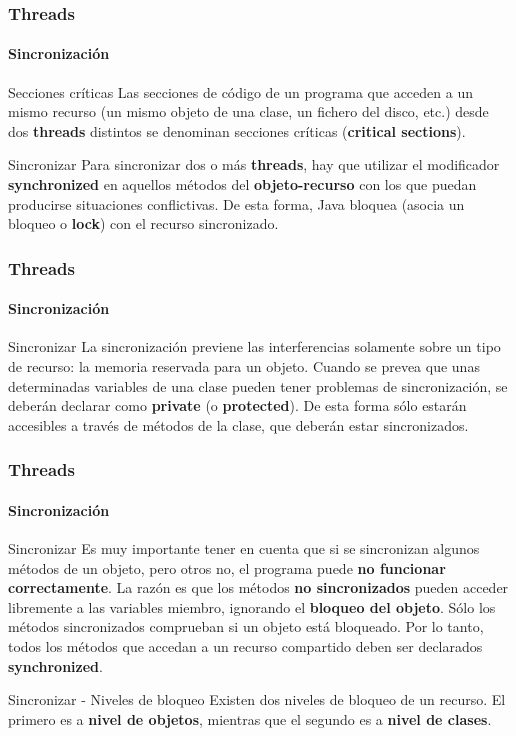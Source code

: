 \documentclass{beamer}
\begin{document}
	\begin{frame}
		\frametitle{Threads}
		\framesubtitle{Sincronizaci\'on}

        \begin{alertblock}{Secciones cr\'iticas}
            Las secciones de c\'odigo de un programa que acceden a un mismo recurso (un mismo objeto de una clase, un fichero del disco, etc.) desde dos \textbf{threads} distintos se denominan secciones cr\'iticas (\textbf{critical sections}).
        \end{alertblock}
        \begin{block}{Sincronizar}
            Para sincronizar dos o m\'as \textbf{threads}, hay que utilizar el modificador \textbf{synchronized} en aquellos m\'etodos del \textbf{objeto-recurso} con los que puedan producirse situaciones conflictivas. De esta forma, Java bloquea (asocia un bloqueo o \textbf{lock}) con el recurso sincronizado.
        \end{block}
	\end{frame}

    \begin{frame}
		\frametitle{Threads}
		\framesubtitle{Sincronizaci\'on}

        \begin{block}{Sincronizar}
            La sincronizaci\'on previene las interferencias solamente sobre un tipo de recurso: la memoria reservada para un objeto. Cuando se prevea que unas determinadas variables de una clase pueden tener problemas de sincronizaci\'on, se deber\'an declarar como \textbf{private} (o \textbf{protected}). De esta forma s\'olo estar\'an accesibles a trav\'es de m\'etodos de la clase, que deber\'an estar sincronizados.
        \end{block}
	\end{frame}

    \begin{frame}
		\frametitle{Threads}
		\framesubtitle{Sincronizaci\'on}

        \begin{block}{Sincronizar}
            Es muy importante tener en cuenta que si se sincronizan algunos m\'etodos de un objeto, pero otros no, el programa puede \textbf{no funcionar correctamente}. La raz\'on es que los m\'etodos \textbf{no sincronizados} pueden acceder libremente a las variables miembro, ignorando el \textbf{bloqueo del objeto}. S\'olo los m\'etodos sincronizados comprueban si un objeto est\'a bloqueado. Por lo tanto, todos los m\'etodos que accedan a un recurso compartido deben ser declarados \textbf{synchronized}.
        \end{block}
         \begin{block}{Sincronizar - Niveles de bloqueo} 
            Existen dos niveles de bloqueo de un recurso. El primero es a \textbf{nivel de objetos}, mientras que el segundo es a \textbf{nivel de clases}.
        \end{block}
	\end{frame}
\end{document}
